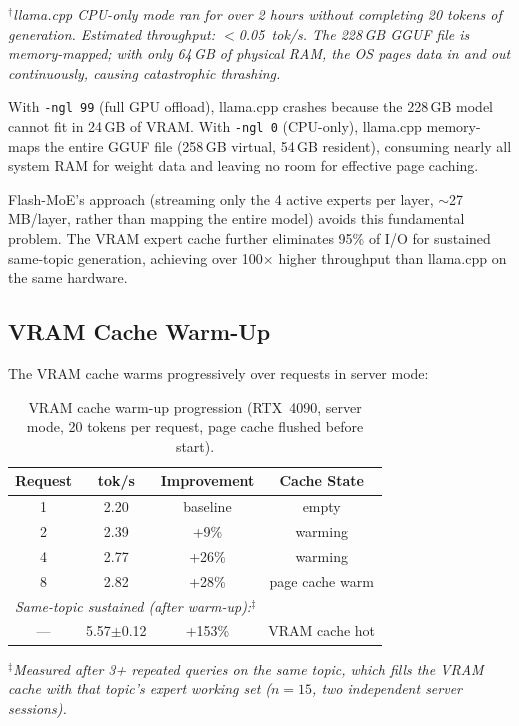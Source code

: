 \documentclass[10pt]{article}
\begin{document}
$^\dagger$\textit{llama.cpp CPU-only mode ran for over 2 hours without completing 20 tokens of generation. Estimated throughput: $<$0.05~tok/s. The 228\,GB GGUF file is memory-mapped; with only 64\,GB of physical RAM, the OS pages data in and out continuously, causing catastrophic thrashing.}

With \texttt{-ngl 99} (full GPU offload), llama.cpp crashes because the 228\,GB model cannot fit in 24\,GB of VRAM. With \texttt{-ngl 0} (CPU-only), llama.cpp memory-maps the entire GGUF file (258\,GB virtual, 54\,GB resident), consuming nearly all system RAM for weight data and leaving no room for effective page caching.

Flash-MoE's approach (streaming only the 4 active experts per layer, $\sim$27\,MB/layer, rather than mapping the entire model) avoids this fundamental problem. The VRAM expert cache further eliminates 95\% of I/O for sustained same-topic generation, achieving over 100$\times$ higher throughput than llama.cpp on the same hardware.

\subsection{VRAM Cache Warm-Up}

The VRAM cache warms progressively over requests in server mode:

\begin{table}[h]
\centering
\small
\caption{VRAM cache warm-up progression (RTX~4090, server mode, 20 tokens per request, page cache flushed before start).}
\label{tab:warmup}
\begin{tabular}{cccc}
\toprule
\textbf{Request} & \textbf{tok/s} & \textbf{Improvement} & \textbf{Cache State} \\
\midrule
1 & 2.20 & baseline & empty \\
2 & 2.39 & +9\% & warming \\
4 & 2.77 & +26\% & warming \\
8 & 2.82 & +28\% & page cache warm \\
\midrule
\multicolumn{4}{l}{\emph{Same-topic sustained (after warm-up):$^\ddagger$}} \\
--- & 5.57$\pm$0.12 & +153\% & VRAM cache hot \\
\bottomrule
\end{tabular}
\end{table}

$^\ddagger$\textit{Measured after 3+ repeated queries on the same topic, which fills the VRAM cache with that topic's expert working set ($n=15$, two independent server sessions).}
\end{document}
